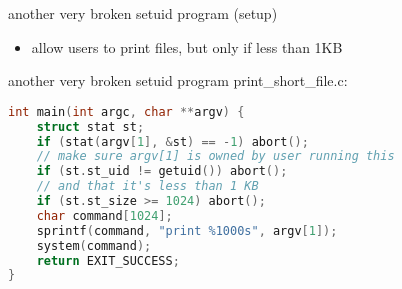 \begin{frame}{another very broken setuid program (setup)}
\begin{itemize}
\item allow users to print files, but only if less than 1KB
\end{itemize}
\end{frame}


\begin{frame}[fragile]{another very broken setuid program}
\lstset{language=C,style=small}
print\_short\_file.c:\\
\begin{lstlisting}[language=C,style=small]
int main(int argc, char **argv) {
    struct stat st;
    if (stat(argv[1], &st) == -1) abort();
    // make sure argv[1] is owned by user running this
    if (st.st_uid != getuid()) abort();
    // and that it's less than 1 KB
    if (st.st_size >= 1024) abort();
    char command[1024];
    sprintf(command, "print %1000s", argv[1]);
    system(command);
    return EXIT_SUCCESS;
}
\end{lstlisting}
\end{frame}

